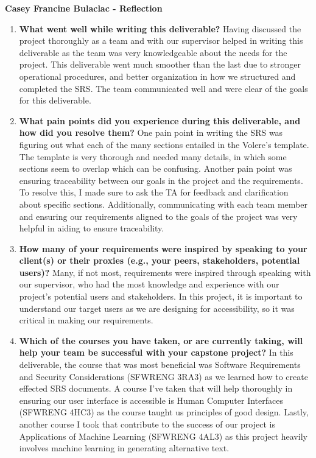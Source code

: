 \textbf{Casey Francine Bulaclac - Reflection}
\begin{enumerate}
  \item \textbf{What went well while writing this deliverable?} \newline
  Having discussed the project thoroughly as a team and with our supervisor helped in writing this deliverable as the team
  was very knowledgeable about the needs for the project. 
  This deliverable went much smoother than the last due to stronger operational procedures, and better organization in how we structured and completed the SRS. 
  The team communicated well and were clear of the goals for this deliverable.
  \item \textbf{What pain points did you experience during this
  deliverable, and how did you resolve them?} \newline
  One pain point in writing the SRS was figuring out what each of the many sections entailed in the Volere's template. The template 
  is very thorough and needed many details, in which some sections seem to overlap which can be confusing. Another pain point was ensuring traceability
  between our goals in the project and the requirements. To resolve this, I made sure to ask the TA for feedback and clarification about specific sections.
  Additionally, communicating with each team member and ensuring our requirements aligned to the goals of the project was very helpful in aiding to ensure
  traceability.
\item \textbf{How many of your requirements were inspired by
      speaking to your client(s) or their proxies (e.g., your peers,
    stakeholders, potential users)?} \newline
  Many, if not most, requirements were inspired through speaking with our supervisor, who had the most knowledge and experience with our project's 
  potential users and stakeholders. In this project, it is important to understand our target users as we are designing for accessibility, so it was critical 
  in making our requirements. 
 \item \textbf{Which of the courses you have taken, or are currently
      taking, will help your team be successful with your capstone
    project?} \newline
  In this deliverable, the course that was most beneficial was Software Requirements and Security Considerations (SFWRENG 3RA3) as we learned how to create effected SRS documents.
  A course I've taken that will help thoroughly in ensuring our user interface is accessible is Human Computer Interfaces (SFWRENG 4HC3) as the course taught us principles of good design. Lastly,
  another course I took that contribute to the success of our project is Applications of Machine Learning (SFWRENG 4AL3) as this project heavily involves machine learning
  in generating alternative text. 
\end{enumerate}